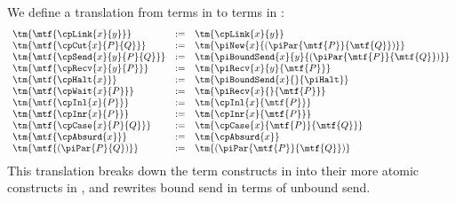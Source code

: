 \begin{definition}\label{def:hcp2hccp-terms}
  We define a translation from terms in \hcp to terms in \hccp:
  \begin{gather*}
    \begin{array}{lcl}
      \tm{\mtf{\cpLink{x}{y}}}
      & := & \tm{\cpLink{x}{y}} \\
      \tm{\mtf{\cpCut{x}{P}{Q}}}
      & := & \tm{\piNew{x}{(\piPar{\mtf{P}}{\mtf{Q}})}} \\
      \tm{\mtf{\cpSend{x}{y}{P}{Q}}}
      & := & \tm{\piBoundSend{x}{y}{(\piPar{\mtf{P}}{\mtf{Q}})}} \\
      \tm{\mtf{\cpRecv{x}{y}{P}}}
      & := & \tm{\piRecv{x}{y}{\mtf{P}}} \\
      \tm{\mtf{\cpHalt{x}}}
      & := & \tm{\piBoundSend{x}{}{\piHalt}} \\
      \tm{\mtf{\cpWait{x}{P}}}
      & := & \tm{\piRecv{x}{}{\mtf{P}}} \\
      \tm{\mtf{\cpInl{x}{P}}}
      & := & \tm{\cpInl{x}{\mtf{P}}} \\
      \tm{\mtf{\cpInr{x}{P}}}
      & := & \tm{\cpInr{x}{\mtf{P}}} \\
      \tm{\mtf{\cpCase{x}{P}{Q}}}
      & := & \tm{\cpCase{x}{\mtf{P}}{\mtf{Q}}} \\
      \tm{\mtf{\cpAbsurd{x}}}
      & := & \tm{\cpAbsurd{x}} \\
      \tm{\mtf{(\piPar{P}{Q})}}
      & := & \tm{(\piPar{\mtf{P}}{\mtf{Q}})}
    \end{array}
  \end{gather*}
  This translation breaks down the term constructs in \hcp into their more
  atomic constructs in \hccp, and rewrites bound send in terms of unbound send.
\end{definition}
